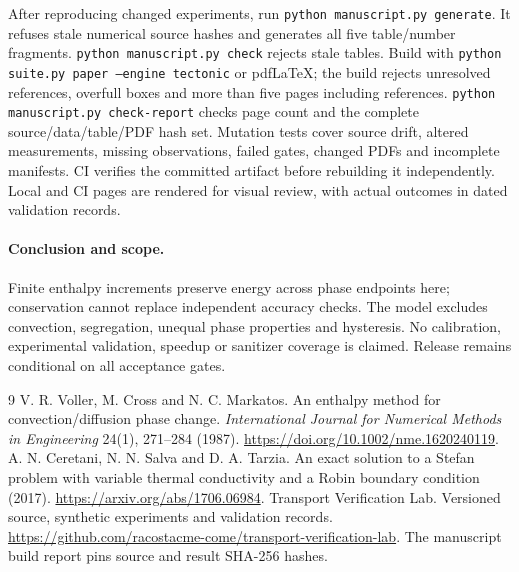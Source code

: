 \documentclass[10pt,a4paper]{article}
\begin{document}
After reproducing changed experiments, run \texttt{python manuscript.py generate}.
It refuses stale numerical source hashes and generates all five table/number
fragments. \texttt{python manuscript.py check} rejects stale tables.
Build with \texttt{python suite.py paper --engine tectonic} or pdfLaTeX;
the build rejects unresolved references, overfull boxes and more than five
pages including references. \texttt{python manuscript.py check-report}
checks page count and the complete source/data/table/PDF hash set.
Mutation tests cover source drift, altered measurements, missing observations,
failed gates, changed PDFs and incomplete manifests. CI verifies the committed
artifact before rebuilding it independently. Local and CI pages are rendered
for visual review, with actual outcomes in dated validation records.

\paragraph{Conclusion and scope.}
Finite enthalpy increments preserve energy across phase endpoints here;
conservation cannot replace independent accuracy checks. The model excludes
convection, segregation, unequal phase properties and hysteresis.
No calibration, experimental validation, speedup or sanitizer coverage is
claimed. Release remains conditional on all acceptance gates.

\begin{thebibliography}{9}\small
{} V. R. Voller, M. Cross and N. C. Markatos.
An enthalpy method for convection/diffusion phase change.
\emph{International Journal for Numerical Methods in Engineering}
24(1), 271--284 (1987). \url{https://doi.org/10.1002/nme.1620240119}.
 A. N. Ceretani, N. N. Salva and D. A. Tarzia.
An exact solution to a Stefan problem with variable thermal conductivity and
a Robin boundary condition (2017). \url{https://arxiv.org/abs/1706.06984}.
 Transport Verification Lab. Versioned source, synthetic
experiments and validation records.
\url{https://github.com/racostacme-come/transport-verification-lab}.
The manuscript build report pins source and result SHA-256 hashes.
\end{thebibliography}
\end{document}
